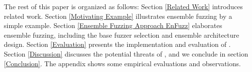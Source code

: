 \vspace{0.03in}
The rest of this paper is organized as follows:
Section \ref{Related Work} introduces related work. 
Section \ref{Motivating Example} illustrates ensemble fuzzing by a simple example.
Section \ref{Ensemble Fuzzing Approach EnFuzz} elaborates ensemble fuzzing, including the base fuzzer selection and ensemble architecture design.
Section \ref{Evaluation} presents the implementation and evaluation of \EnFuzz.
Section \ref{Discussion} discusses the potential threats of \EnFuzz, and we conclude in section \ref{Conclusion}. The appendix shows some empirical evaluations and observations. %

